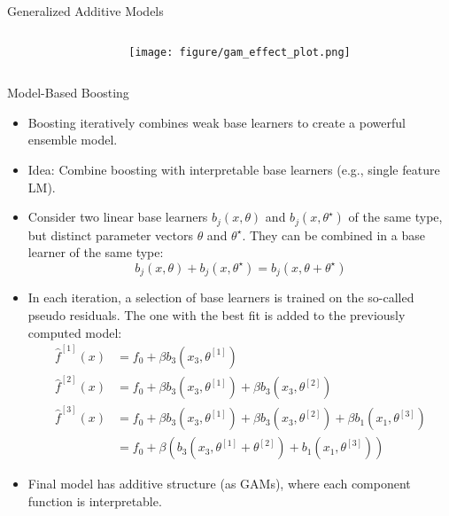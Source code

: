 \documentclass[10pt,compress,t,notes=noshow, xcolor=table]{beamer}
\begin{document}
\begin{frame}{Generalized Additive Models}
\begin{columns}[T]
\begin{column}{0.55\textwidth}
\tiny

\end{column}
\begin{column}{0.45\textwidth}  %
  \texttt{[image: figure/gam\_effect\_plot.png]}
\end{column}
\end{columns}
\end{frame}


\begin{frame}{Model-Based Boosting}

\begin{itemize}
\item
Boosting iteratively combines weak base learners to create a powerful ensemble model.
\item
Idea: Combine boosting with interpretable base learners (e.g., single feature LM). 
\item
Consider two linear base learners $b_j(x, \theta)$ and $b_j(x, \theta^{\star})$ of the same type, but distinct parameter vectors $\theta$ and $\theta^{\star}$. They can be combined in a base learner of the same type:
$$
b_j(x, \theta) + b_j(x, \theta^{\star}) = b_j(x, \theta + \theta^{\star})
$$
\item In each iteration, a selection of base learners is trained on the so-called pseudo residuals. The one with the best fit is added to the previously computed model:
\medskip
\begin{align*}
\widehat{f}^{[1]}(x) &= f_0 + \beta b_3(x_3, \theta^{[1]}) \\
\widehat{f}^{[2]}(x) &= f_0 + \beta b_3(x_3, \theta^{[1]}) + \beta b_3(x_3, \theta^{[2]})\\
\widehat{f}^{[3]}(x) &= f_0 + \beta b_3(x_3, \theta^{[1]}) + \beta b_3(x_3, \theta^{[2]}) + \beta b_1(x_1, \theta^{[3]}) \\
&= f_0 + \beta \left(b_3(x_3, \theta^{[1]} + \theta^{[2]}) + b_1(x_1, \theta^{[3]})\right)
\end{align*}

\item Final model has additive structure (as GAMs), where each component function is interpretable.

\end{itemize}
\end{frame}
\end{document}
